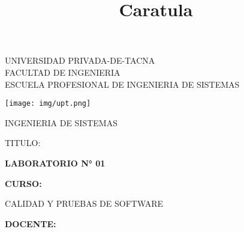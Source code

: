 \documentclass[12pt,letterpaper]{article}
\begin{document}
%


\title{Caratula}

\begin{titlepage}
\begin{center}
\large{UNIVERSIDAD PRIVADA-DE-TACNA }
\\FACULTAD DE INGENIERIA
\\ESCUELA PROFESIONAL DE INGENIERIA DE SISTEMAS

\vspace*{-0.025in}
\begin{figure}[htb]
\begin{center}

\end{center}
\end{figure}
\begin{center}
    \texttt{[image: img/upt.png]}  
\end{center}

\vspace*{0.15in}
INGENIERIA DE SISTEMAS  \\

\vspace*{0.5in}
\begin{large}
TITULO:\\
\end{large}

\vspace*{0.1in}
\begin{Large}
\textbf{LABORATORIO N° 01} \\
\end{Large}

\vspace*{0.3in}
\begin{Large}
\textbf{CURSO:} \\
\end{Large}

\vspace*{0.1in}
\begin{large}
CALIDAD Y PRUEBAS DE SOFTWARE\\
\end{large}

\vspace*{0.3in}
\begin{Large}
\textbf{DOCENTE:} \\
\end{Large}


\end{center}
\end{titlepage}
\end{document}
